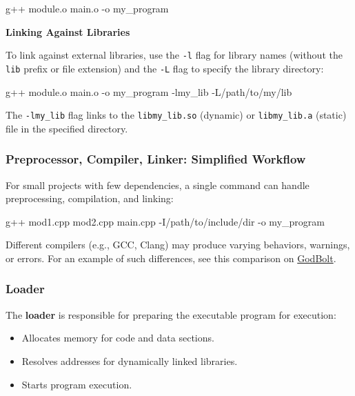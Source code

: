 \vspace{-0.3em}

\begin{codeblock}[language=bash, numbers=none]
g++ module.o main.o -o my_program
\end{codeblock}


\textbf{Linking Against Libraries}

To link against external libraries, use the \texttt{-l} flag for library names (without the \texttt{lib} prefix or file extension) and the \texttt{-L} flag to specify the library directory:

\vspace{-0.3em}

\begin{codeblock}[language=bash, numbers=none]
g++ module.o main.o -o my_program -lmy_lib -L/path/to/my/lib
\end{codeblock}

The \texttt{-lmy\_lib} flag links to the \texttt{libmy\_lib.so} (dynamic) or \texttt{libmy\_lib.a} (static) file in the specified directory.

\subsubsection{Preprocessor, Compiler, Linker: Simplified Workflow}

For small projects with few dependencies, a single command can handle preprocessing, compilation, and linking:

\vspace{-0.3em}

\begin{codeblock}[language=bash, numbers=none]
g++ mod1.cpp mod2.cpp main.cpp -I/path/to/include/dir -o my_program
\end{codeblock}

\begin{warningblock}
Different compilers (e.g., GCC, Clang) may produce varying behaviors, warnings, or errors. For an example of such differences, see this comparison on \href{https://godbolt.org/z/1M83E4sYE}{GodBolt}.
\end{warningblock}

\subsubsection{Loader}

The \textbf{loader} is responsible for preparing the executable program for execution:
\begin{itemize}
    \item Allocates memory for code and data sections.
    \item Resolves addresses for dynamically linked libraries.
    \item Starts program execution.
\end{itemize}

